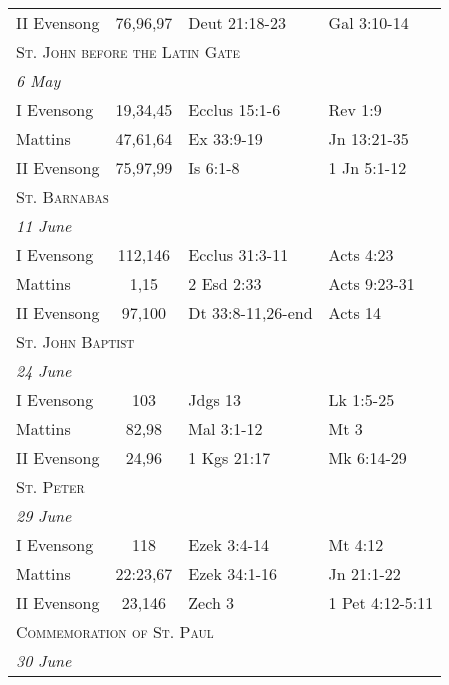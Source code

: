 \begin{longtable}{l c l l}
\hspace{1em} II Evensong&76,96,97&Deut 21:18-23&Gal 3:10-14\\
%
\multicolumn{4}{l}{\textsc{St. John before the Latin Gate}}\\
\multicolumn{4}{l}{\textit{6 May}}\\
\hspace{1em} I Evensong&19,34,45&Ecclus 15:1-6&Rev 1:9\\
\hspace{1em} Mattins&47,61,64&Ex 33:9-19&Jn 13:21-35\\
\hspace{1em} II Evensong&75,97,99&Is 6:1-8&1 Jn 5:1-12\\
%
\multicolumn{4}{l}{\textsc{St. Barnabas}}\\
\multicolumn{4}{l}{\textit{11 June}}\\
\hspace{1em} I Evensong&112,146&Ecclus 31:3-11&Acts 4:23\\
\hspace{1em} Mattins&1,15&2 Esd 2:33&Acts 9:23-31\\
\hspace{1em} II Evensong&97,100&Dt 33:8-11,26-end&Acts 14\\
\multicolumn{4}{l}{\textsc{St. John Baptist}}\\
\multicolumn{4}{l}{\textit{24 June}}\\
\hspace{1em} I Evensong&103&Jdgs 13&Lk 1:5-25\\
\hspace{1em} Mattins&82,98&Mal 3:1-12&Mt 3\\
\hspace{1em} II Evensong&24,96&1 Kgs 21:17&Mk 6:14-29\\
\multicolumn{4}{l}{\textsc{St. Peter}}\\
\multicolumn{4}{l}{\textit{29 June}}\\
\hspace{1em} I Evensong&118&Ezek 3:4-14&Mt 4:12\\
\hspace{1em} Mattins&22:23,67&Ezek 34:1-16&Jn 21:1-22\\
\hspace{1em} II Evensong&23,146&Zech 3&1 Pet 4:12-5:11\\
%
\multicolumn{4}{l}{\textsc{Commemoration of St. Paul}}\\
\multicolumn{4}{l}{\textit{30 June}}\\

\end{longtable}
